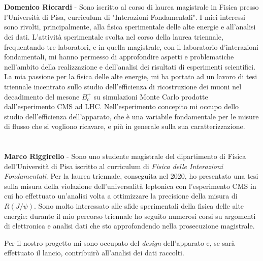 \documentclass{article}
\begin{document}
\section*{}
\textbf{Domenico Riccardi} - Sono iscritto al corso di laurea magistrale in Fisica presso l'Università di Pisa, curriculum di "Interazioni Fondamentali". I miei interessi sono rivolti, principalmente, alla fisica sperimentale delle alte energie e all'analisi dei dati. L'attività sperimentale svolta nel corso della laurea triennale, frequentando tre laboratori, e in quella magistrale, con il laboratorio d'interazioni fondamentali, mi hanno permesso di approfondire aspetti e problematiche nell'ambito della realizzazione e dell'analisi dei risultati di esperimenti scientifici. La mia passione per la fisica delle alte energie, mi ha portato ad un lavoro di tesi triennale incentrato sullo studio dell'efficienza di ricostruzione dei muoni nel decadimento del mesone $B_c^+$ su simulazioni Monte Carlo prodotte dall'esperimento CMS ad LHC. Nell'esperimento concepito mi occupo dello studio dell'efficienza dell'apparato, che è una variabile fondamentale per le misure di flusso che si vogliono ricavare, e più in generale sulla sua caratterizzazione.

\section*{}
\textbf{Marco Riggirello} - Sono uno studente magistrale del dipartimento di Fisica dell'Università di Pisa iscritto al curriculum di \emph{Fisica delle Interazioni Fondamentali}. Per la laurea triennale, conseguita nel 2020, ho presentato una tesi sulla misura della violazione dell'universalità leptonica con l'esperimento CMS in cui ho effettuato un'analisi volta a ottimizzare la precisione della misura di $R(J/\psi)$. Sono molto interessato alle sfide sperimentali della fisica delle alte energie: durante il mio percorso triennale ho seguito numerosi corsi su argomenti di elettronica e analisi dati che sto approfondendo nella prosecuzione magistrale. 

Per il nostro progetto mi sono occupato del \emph{design} dell'apparato e, se sarà effettuato il lancio, contribuir\`o all'analisi dei dati raccolti.
\end{document}
